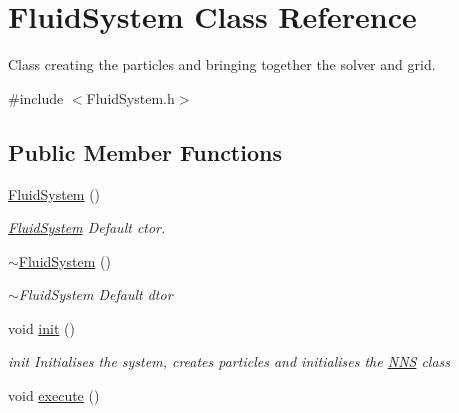 \hypertarget{classFluidSystem}{}\section{Fluid\+System Class Reference}
\label{classFluidSystem}


Class creating the particles and bringing together the solver and grid.  




{\ttfamily \#include $<$Fluid\+System.\+h$>$}

\subsection*{Public Member Functions}
\begin{DoxyCompactItemize}
\item 
\hyperlink{classFluidSystem_a026c527ec418ae285285ffb2b877d1dc}{Fluid\+System} ()\hypertarget{classFluidSystem_a026c527ec418ae285285ffb2b877d1dc}{}\label{classFluidSystem_a026c527ec418ae285285ffb2b877d1dc}

\begin{DoxyCompactList}\small\item\em \hyperlink{classFluidSystem}{Fluid\+System} Default ctor. \end{DoxyCompactList}\item 
\hyperlink{classFluidSystem_a568108df17c8fe0ec5fce2ad225ae0cc}{$\sim$\+Fluid\+System} ()\hypertarget{classFluidSystem_a568108df17c8fe0ec5fce2ad225ae0cc}{}\label{classFluidSystem_a568108df17c8fe0ec5fce2ad225ae0cc}

\begin{DoxyCompactList}\small\item\em $\sim$\+Fluid\+System Default dtor \end{DoxyCompactList}\item 
void \hyperlink{classFluidSystem_a21064e9269b8ec6f9825aaaaa1851292}{init} ()\hypertarget{classFluidSystem_a21064e9269b8ec6f9825aaaaa1851292}{}\label{classFluidSystem_a21064e9269b8ec6f9825aaaaa1851292}

\begin{DoxyCompactList}\small\item\em init Initialises the system, creates particles and initialises the \hyperlink{classNNS}{N\+NS} class \end{DoxyCompactList}\item 
void \hyperlink{classFluidSystem_a7161be2137b35e4b26699b1c64099bf9}{execute} ()\hypertarget{classFluidSystem_a7161be2137b35e4b26699b1c64099bf9}{}\label{classFluidSystem_a7161be2137b35e4b26699b1c64099bf9}


\end{DoxyCompactItemize}
